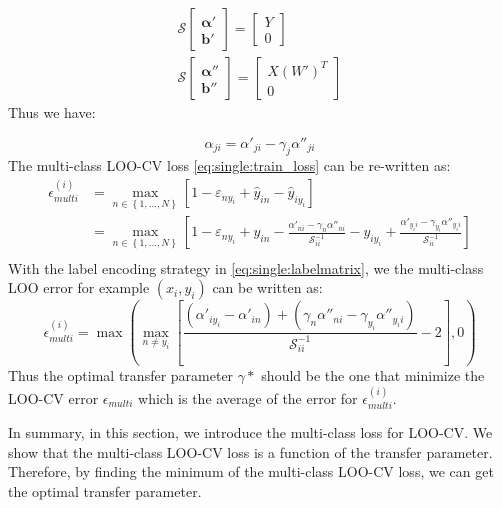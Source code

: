 \begin{equation}
\begin{array}{c}
{\mathcal{S}}\left[ {\begin{array}{*{20}{c}}
	{\boldsymbol{\alpha} '}\\
	{\boldsymbol{b}'}
	\end{array}} \right] = \left[ {\begin{array}{*{20}{c}}
	Y\\
	0
	\end{array}} \right]\\
{\mathcal{S}}\left[ {\begin{array}{*{20}{c}}
	{\boldsymbol{\alpha} ''}\\
	{\boldsymbol{b}''}
	\end{array}} \right] = \left[ {\begin{array}{*{20}{c}}
	{X{{\left( {W'} \right)}^T}}\\
	0
	\end{array}} \right]
\end{array}
\end{equation}
Thus we have:

\begin{equation}
	\alpha_{ji} = \alpha'_{ji} - \gamma_j \alpha''_{ji}
\end{equation}
The multi-class LOO-CV loss \eqref{eq:single:train_loss} can be re-written as:
\begin{equation}
	\begin{aligned}
	\epsilon^{(i)} _{multi} &= \mathop {\max }\limits_{n \in \left\lbrace 1,...,N \right\rbrace } {\left[ {1 - {\varepsilon _{n{y_i}}} + \hat{y}_{in} - \hat{y}_{iy_i}} \right]}\\
	&=\mathop {\max }\limits_{n \in \left\lbrace 1,...,N \right\rbrace }{\left[ {1 - {\varepsilon _{n{y_i}}} + {y}_{in}-\frac{\alpha'_{ni} - \gamma_n \alpha''_{ni}}{\mathcal{S}^{-1}_{ii}} - {y}_{iy_i}} + \frac{\alpha'_{y_ii} - \gamma_{y_i} \alpha''_{y_ii}}{\mathcal{S}^{-1}_{ii}} \right]}\\
	\end{aligned}
\end{equation}
With the label encoding strategy in \eqref{eq:single:labelmatrix}, we the multi-class LOO error for example $(x_i,y_i)$ can be written as:
\begin{equation}
\epsilon^{(i)} _{multi} = \max \left(\mathop{\max}_{n \neq y_i}\left[\frac{(\alpha'_{iy_i}-\alpha'_{in})+(\gamma_n \alpha''_{ni}-\gamma_{y_i} \alpha''_{y_ii})}{\mathcal{S}^{-1}_{ii}}-2\right],0\right)
\end{equation} 
Thus the optimal transfer parameter $\gamma*$ should be the one that minimize the LOO-CV error $\epsilon _{multi}$ which is the average of the error for $\epsilon^{(i)} _{multi}$.

In summary, in this section, we introduce the multi-class loss for LOO-CV. We show that the multi-class LOO-CV loss is a function of the transfer parameter. Therefore, by finding the minimum of the multi-class LOO-CV loss, we can get the optimal transfer parameter.
